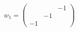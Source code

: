 \begin{equation}
w_1= \left(\begin{array}{ccc}
  & & -1 \\
 & -1 & \\
-1 & & 
\end{array} \right)
\end{equation}

